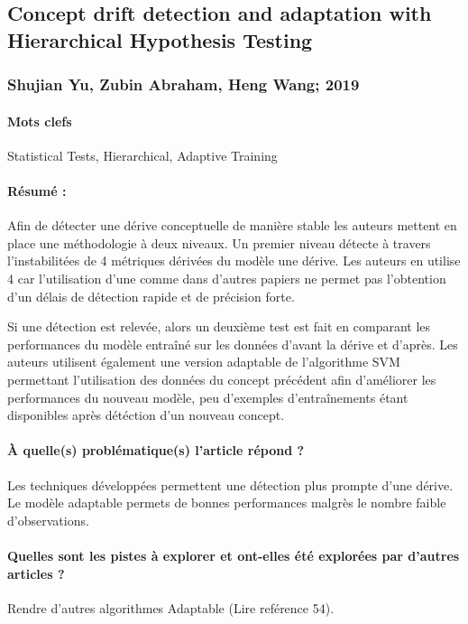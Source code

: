 \documentclass[11pt,a4paper]{report}
\begin{document}
\subsection{Concept drift detection and adaptation with Hierarchical Hypothesis Testing}
\subsubsection{Shujian Yu, Zubin Abraham, Heng Wang; 2019}

\paragraph{Mots clefs} Statistical Tests, Hierarchical, Adaptive Training

\paragraph{Résumé :} Afin de détecter une dérive conceptuelle de manière stable les auteurs mettent en place une méthodologie à deux niveaux. Un premier niveau détecte à travers l'instabilitées de 4 métriques dérivées du modèle une dérive. Les auteurs en utilise 4 car l'utilisation d'une comme dans d'autres papiers ne permet pas l'obtention d'un délais de détection rapide et de précision forte.

Si une détection est relevée, alors un deuxième test est fait en comparant les performances du modèle entraîné sur les données d'avant la dérive et d'après. Les auteurs utilisent également une version adaptable de l'algorithme SVM permettant l'utilisation des données du concept précédent afin d'améliorer les performances du nouveau modèle, peu d'exemples d'entraînements étant disponibles après détéction d'un nouveau concept.

\paragraph{À quelle(s) problématique(s) l'article répond ?} Les techniques développées permettent une détection plus prompte d'une dérive. Le modèle adaptable permets de bonnes performances malgrès le nombre faible d'observations.

\paragraph{Quelles sont les pistes à explorer et ont-elles  été explorées par d'autres articles ?} Rendre d'autres algorithmes Adaptable (Lire  reférence 54).
\end{document}
